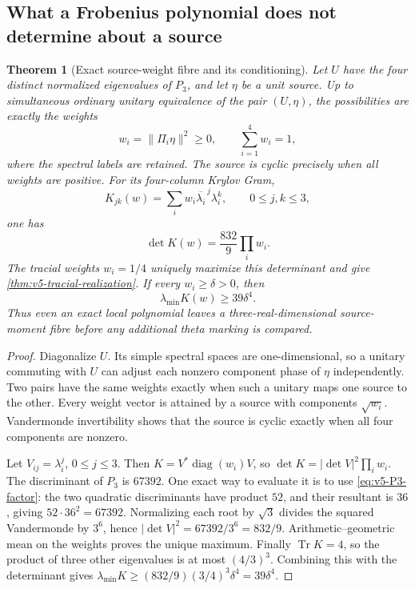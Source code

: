 \documentclass[11pt]{article}
\newtheorem{theorem}{Theorem}[section]
\theoremstyle{definition}
\theoremstyle{remark}
\newcommand{\Tr}{\operatorname{Tr}}
\newcommand{\norm}[1]{\lVert#1\rVert}
\begin{document}
\subsection{What a Frobenius polynomial does not determine about a source}
\begin{theorem}[Exact source-weight fibre and its conditioning]
\label{thm:v5-weight-fibre}
Let $U$ have the four distinct normalized eigenvalues of $P_3$, and let
$\eta$ be a unit source. Up to simultaneous ordinary unitary equivalence
of the pair $(U,\eta)$, the possibilities are exactly the weights
\begin{equation}
 \boxed{w_i=\norm{\Pi_i\eta}^2\ge0,\qquad \sum_{i=1}^4w_i=1,}
 \label{eq:v5-source-simplex}
\end{equation}
where the spectral labels are retained. The source is cyclic precisely
when all weights are positive. For its four-column Krylov Gram,
\begin{equation}
 K_{jk}(w)=\sum_iw_i\overline{\lambda_i}^{\,j}\lambda_i^k,
 \qquad 0\le j,k\le3,
\end{equation}
one has
\begin{equation}
 \boxed{\det K(w)=\frac{832}{9}\prod_iw_i.}
 \label{eq:v5-weight-determinant}
\end{equation}
The tracial weights $w_i=1/4$ uniquely maximize this determinant and give
\cref{thm:v5-tracial-realization}. If every $w_i\ge\delta>0$, then
\begin{equation}
 \lambda_{\min}K(w)\ge39\delta^4.
 \label{eq:v5-source-weight-floor}
\end{equation}
Thus even an exact local polynomial leaves a three-real-dimensional
source-moment fibre before any additional theta marking is compared.
\end{theorem}
\begin{proof}
Diagonalize $U$. Its simple spectral spaces are one-dimensional, so a
unitary commuting with $U$ can adjust each nonzero component phase of
$\eta$ independently. Two pairs have the same weights exactly when such
a unitary maps one source to the other. Every weight vector is attained
by a source with components $\sqrt{w_i}$. Vandermonde invertibility shows
that the source is cyclic exactly when all four components are nonzero.

Let $V_{ij}=\lambda_i^j$, $0\le j\le3$. Then
$K=V^*\operatorname{diag}(w_i)V$, so
$\det K=|\det V|^2\prod_iw_i$. The discriminant of $P_3$ is
$67392$. One exact way to evaluate it is to use
\eqref{eq:v5-P3-factor}: the two quadratic discriminants have product
$52$, and their resultant is $36$, giving $52\cdot36^2=67392$.
Normalizing each root by $\sqrt3$ divides the squared Vandermonde by
$3^6$, hence $|\det V|^2=67392/3^6=832/9$.
Arithmetic--geometric mean on the weights proves the unique maximum.
Finally $\Tr K=4$, so the product of three other eigenvalues is at most
$(4/3)^3$. Combining this with the determinant gives
$\lambda_{\min}K\ge(832/9)(3/4)^3\delta^4=39\delta^4$.
\end{proof}
\end{document}
